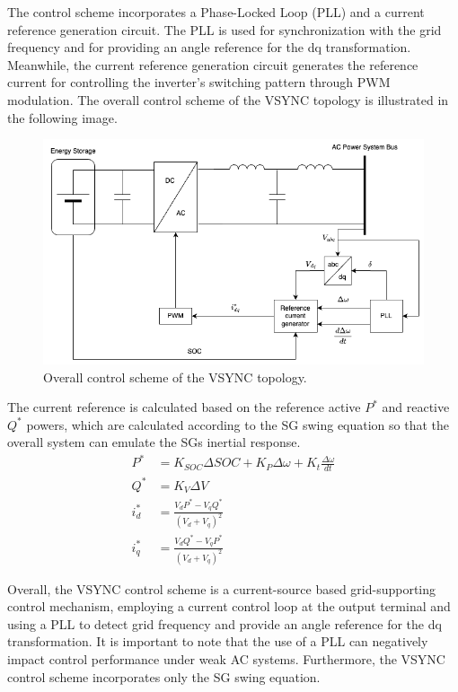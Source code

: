 The control scheme incorporates a Phase-Locked Loop (PLL) and a current
reference generation circuit. The PLL is used for synchronization with the grid
frequency and for providing an angle reference for the dq transformation.
Meanwhile, the current reference generation circuit generates the reference
current for controlling the inverter's switching pattern through PWM modulation.
The overall control scheme of the VSYNC topology is illustrated in the following
image.

\begin{figure}
    \centering
    \includegraphics[width=12cm]{images/VSYNC.png}
    \caption{Overall control scheme of the VSYNC topology.}
    \label{fig:VSYNC}
\end{figure}

The current reference is calculated based on the reference active $P^*$ and
reactive $Q^*$ powers, which are calculated according to the SG swing equation
so that the overall system can emulate the SGs inertial response.
\begin{equation*}
    \begin{aligned}
        P^* &= K_{SOC}\Delta SOC + K_P \Delta\omega + K_t \frac{\Delta \omega}{dt}\\
        Q^* &= K_V \Delta V\\
        i_{d}^* &= \frac{V_d P^* - V_q Q^*}{(V_d + V_q)^2}\\
        i_{q}^* &= \frac{V_d Q^* - V_q P^*}{(V_d + V_q)^2}
    \end{aligned}
\end{equation*}

Overall, the VSYNC control scheme is a current-source based grid-supporting control
mechanism, employing a current control loop at the output terminal and using a
PLL to detect grid frequency and provide an angle reference for the dq
transformation. It is important to note that the use of a PLL can negatively
impact control performance under weak AC systems. Furthermore, the VSYNC control
scheme incorporates only the SG swing equation.


